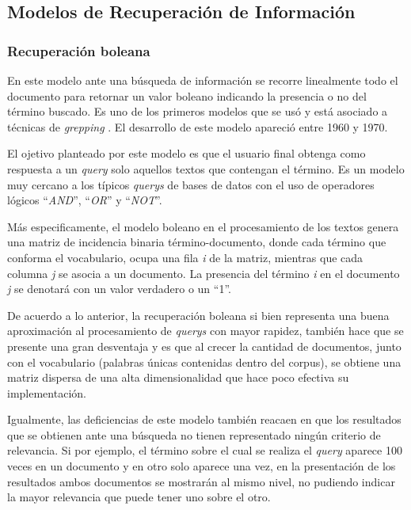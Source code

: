 \documentclass[
  12pt,
  openany]{book}
\begin{document}
\hypertarget{MRI}{%
\subsection{Modelos de Recuperación de Información}\label{MRI}}

\hypertarget{MRIbol}{%
\subsubsection{Recuperación boleana}\label{MRIbol}}

En este modelo ante una búsqueda de información se recorre linealmente todo el documento para retornar un valor boleano indicando la presencia o no del término buscado. Es uno de los primeros modelos que se usó y está asociado a técnicas de \emph{grepping} \citep{manning2008}. El desarrollo de este modelo apareció entre 1960 y 1970.

El ojetivo planteado por este modelo es que el usuario final obtenga como respuesta a un \emph{query} solo aquellos textos que contengan el término. Es un modelo muy cercano a los típicos \emph{querys} de bases de datos con el uso de operadores lógicos ``\emph{AND}'', ``\emph{OR}'' y ``\emph{NOT}''.

Más especificamente, el modelo boleano en el procesamiento de los textos genera una matriz de incidencia binaria término-documento, donde cada término que conforma el vocabulario, ocupa una fila \emph{i} de la matriz, mientras que cada columna \emph{j} se asocia a un documento. La presencia del término \emph{i} en el documento \emph{j} se denotará con un valor verdadero o un ``1''.

De acuerdo a lo anterior, la recuperación boleana si bien representa una buena aproximación al procesamiento de \emph{querys} con mayor rapidez, también hace que se presente una gran desventaja y es que al crecer la cantidad de documentos, junto con el vocabulario (palabras únicas contenidas dentro del corpus), se obtiene una matriz dispersa de una alta dimensionalidad que hace poco efectiva su implementación.

Igualmente, las deficiencias de este modelo también reacaen en que los resultados que se obtienen ante una búsqueda no tienen representado ningún criterio de relevancia. Si por ejemplo, el término sobre el cual se realiza el \emph{query} aparece 100 veces en un documento y en otro solo aparece una vez, en la presentación de los resultados ambos documentos se mostrarán al mismo nivel, no pudiendo indicar la mayor relevancia que puede tener uno sobre el otro.
\end{document}
